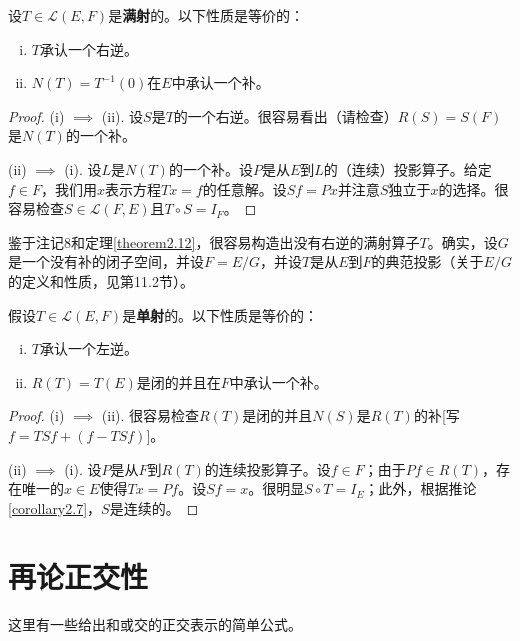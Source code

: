 \begin{theorem}\label{theorem2.12}
设$T \in \mathcal{L}(E,F)$是\textbf{满射}的。以下性质是等价的：
\begin{enumerate}[(i)]
    \item $T$承认一个右逆。
    \item $N(T) = T^{-1}(0)$在$E$中承认一个补。
\end{enumerate}
\end{theorem}
\begin{proof}
(i) $\implies$ (ii). 设$S$是$T$的一个右逆。很容易看出（请检查）$R(S)=S(F)$是$N(T)$的一个补。

(ii) $\implies$ (i). 设$L$是$N(T)$的一个补。设$P$是从$E$到$L$的（连续）投影算子。给定$f \in F$，我们用$x$表示方程$Tx=f$的任意解。设$S f = Px$并注意$S$独立于$x$的选择。很容易检查$S \in \mathcal{L}(F,E)$且$T \circ S = I_F$。
\end{proof}

\begin{remark}
鉴于注记8和定理\ref{theorem2.12}，很容易构造出没有右逆的满射算子$T$。确实，设$G$是一个没有补的闭子空间，并设$F=E/G$，并设$T$是从$E$到$F$的典范投影（关于$E/G$的定义和性质，见第11.2节）。
\end{remark}

\begin{theorem}\label{theorem2.13}
假设$T \in \mathcal{L}(E,F)$是\textbf{单射}的。以下性质是等价的：
\begin{enumerate}[(i)]
    \item $T$承认一个左逆。
    \item $R(T)=T(E)$是闭的并且在$F$中承认一个补。
\end{enumerate}
\end{theorem}
\begin{proof}
(i) $\implies$ (ii). 很容易检查$R(T)$是闭的并且$N(S)$是$R(T)$的补[写$f=TSf+(f-TSf)$]。

(ii) $\implies$ (i). 设$P$是从$F$到$R(T)$的连续投影算子。设$f \in F$；由于$Pf \in R(T)$，存在唯一的$x \in E$使得$Tx=Pf$。设$Sf=x$。很明显$S \circ T = I_E$；此外，根据推论\ref{corollary2.7}，$S$是连续的。
\end{proof}


\section{再论正交性}

这里有一些给出和或交的正交表示的简单公式。

